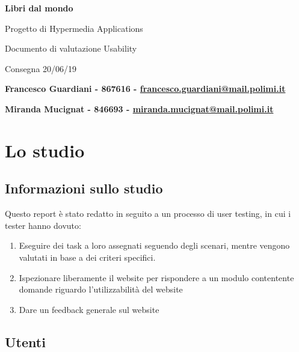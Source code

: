 \documentclass[12pt,a4paper,oneside]{report}
\begin{document}
\begin{titlepage}
   \begin{center}
       \vspace*{1cm}
 
       {\huge \textbf{Libri dal mondo}}
 
       \vspace{0.5cm}
        {\Large Progetto di Hypermedia Applications}
        
        \vspace{0.5cm}
        {\large{Documento di valutazione Usability}}
        
       \vspace{0.5cm}
        Consegna 20/06/19
 
       \vspace{1cm}
 
       \textbf{Francesco Guardiani - 867616 -  \href{mailto:francesco.guardiani@mail.polimi.it}{francesco.guardiani@mail.polimi.it}}
       
      \textbf{Miranda Mucignat - 846693 -  \href{mailto:miranda.mucignat@mail.polimi.it}{miranda.mucignat@mail.polimi.it}}
 
   \end{center}
\end{titlepage}

\tableofcontents
\newpage

\chapter{Lo studio}

\section{Informazioni sullo studio}

Questo report è stato redatto in seguito a un processo di user testing, in cui i tester hanno dovuto:

\begin{enumerate}
	\item Eseguire dei task a loro assegnati seguendo degli scenari, mentre vengono valutati in base a dei criteri specifici.
	\item Ispezionare liberamente il website per rispondere a un modulo contentente domande riguardo l'utilizzabilità del website
	\item Dare un feedback generale sul website
\end{enumerate}

\section{Utenti}
\end{document}
